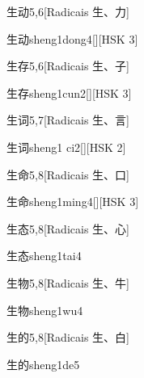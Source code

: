 \begin{entry}{生动}{5,6}[Radicais ⽣、⼒]
  \begin{phonetics}{生动}{sheng1dong4}[][HSK 3]
  \end{phonetics}
\end{entry}

\begin{entry}{生存}{5,6}[Radicais ⽣、⼦]
  \begin{phonetics}{生存}{sheng1cun2}[][HSK 3]
  \end{phonetics}
\end{entry}

\begin{entry}{生词}{5,7}[Radicais ⽣、⾔]
  \begin{phonetics}{生词}{sheng1 ci2}[][HSK 2]
  \end{phonetics}
\end{entry}

\begin{entry}{生命}{5,8}[Radicais ⽣、⼝]
  \begin{phonetics}{生命}{sheng1ming4}[][HSK 3]
  \end{phonetics}
\end{entry}

\begin{entry}{生态}{5,8}[Radicais ⽣、⼼]
  \begin{phonetics}{生态}{sheng1tai4}
  \end{phonetics}
\end{entry}

\begin{entry}{生物}{5,8}[Radicais ⽣、⽜]
  \begin{phonetics}{生物}{sheng1wu4}
  \end{phonetics}
\end{entry}

\begin{entry}{生的}{5,8}[Radicais ⽣、⽩]
  \begin{phonetics}{生的}{sheng1de5}
  \end{phonetics}
\end{entry}

